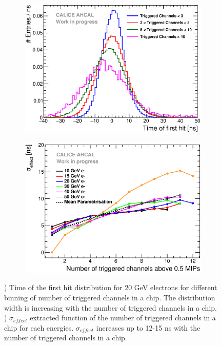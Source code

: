 \begin{figure}[htbp!]
	\begin{subfigure}[t]{0.49\textwidth}
		\centering
		\includegraphics[width=1\linewidth]{../Thesis_Plots/Timing/Electrons/Plots/TimingHitsBins_20GeV.eps}
		\caption{} \label{fig:ped_shift_dist_para}
	\end{subfigure}
	\hfill
	\begin{subfigure}[t]{0.49\textwidth}
		\centering
		\includegraphics[width=1\linewidth]{../Thesis_Plots/Timing/Electrons/Plots/MeanParametrisation.eps}
		\caption{} \label{fig:para_fit}
	\end{subfigure}
	\caption{) Time of the first hit distribution for 20 GeV electrons for different binning of number of triggered channels in a chip. The distribution width is increasing with the number of triggered channels in a chip. ) $\sigma_{effect}$ extracted function of the number of triggered channels in a chip for each energies. $\sigma_{effect}$ increases up to 12-15 ns with the number of triggered channels in a chip.}
\end{figure}


